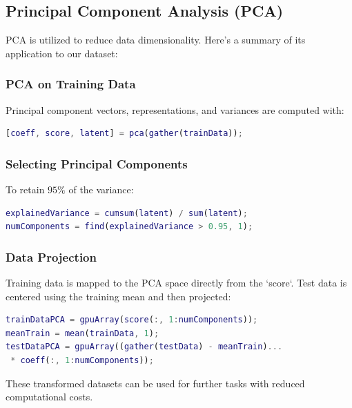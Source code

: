 \subsection{Principal Component Analysis (PCA)}

PCA is utilized to reduce data dimensionality. Here's a summary of its application to our dataset:

\subsubsection{PCA on Training Data}

Principal component vectors, representations, and variances are computed with:
\begin{lstlisting}[language=Matlab]
[coeff, score, latent] = pca(gather(trainData));
\end{lstlisting}

\subsubsection{Selecting Principal Components}

To retain \(95\%\) of the variance:
\begin{lstlisting}[language=Matlab]
explainedVariance = cumsum(latent) / sum(latent);
numComponents = find(explainedVariance > 0.95, 1);
\end{lstlisting}

\subsubsection{Data Projection}

Training data is mapped to the PCA space directly from the `score`. Test data is centered using the training mean and then projected:
\begin{lstlisting}[language=Matlab]
trainDataPCA = gpuArray(score(:, 1:numComponents));
meanTrain = mean(trainData, 1);
testDataPCA = gpuArray((gather(testData) - meanTrain)...
 * coeff(:, 1:numComponents));
\end{lstlisting}

These transformed datasets can be used for further tasks with reduced computational costs.




